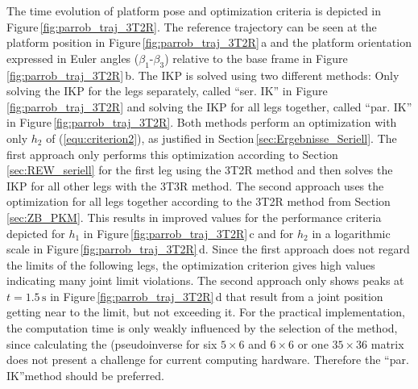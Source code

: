 \documentclass[robotics,article,accept,moreauthors,pdftex]{Definitions/mdpi}
\begin{document}
The time evolution of platform pose and optimization criteria is depicted in Figure\,\ref{fig:parrob_traj_3T2R}.
The reference trajectory can be seen at the platform position in Figure\,\ref{fig:parrob_traj_3T2R}\,a and the platform orientation expressed in Euler angles ($\beta_1$-$\beta_3$) relative to the base frame in Figure\,\ref{fig:parrob_traj_3T2R}\,b.
The IKP is solved using two different methods: Only solving the IKP for the legs separately, called ``ser. IK'' in Figure\,\ref{fig:parrob_traj_3T2R} and solving the IKP for all legs together, called ``par. IK'' in Figure\,\ref{fig:parrob_traj_3T2R}.
Both methods perform an optimization with only $h_2$ of (\ref{equ:criterion2}), as justified in Section\,\ref{sec:Ergebnisse_Seriell}.
The first approach only performs this optimization according to Section\,\ref{sec:REW_seriell} for the first leg using the 3T2R method and then solves the IKP for all other legs with the 3T3R method.
The second approach uses the optimization for all legs together according to the 3T2R method from Section\,\ref{sec:ZB_PKM}.
This results in improved values for the performance criteria depicted for $h_1$ in Figure\,\ref{fig:parrob_traj_3T2R}\,c and for $h_2$ in a logarithmic scale in Figure\,\ref{fig:parrob_traj_3T2R}\,d.
Since the first approach does not regard the limits of the following legs, the optimization criterion gives high values indicating many joint limit violations.
The second approach only shows peaks at $t=1.5\,\mathrm{s}$ in Figure\,\ref{fig:parrob_traj_3T2R}\,d that result from a joint position getting near to the limit, but not exceeding it.
For the practical implementation, the computation time is only weakly influenced by the selection of the method, since calculating the (pseudo\replaced[id=Sp]{-)}{)-}inverse for six $5 \times 6$ and $6 \times 6$  or one $35 \times 36$ matrix does not present a challenge for current computing hardware.
Therefore\added[id=Sp]{,} the ``par. IK''\replaced[id=Sp]{ }{-}method should be preferred.
\end{document}
